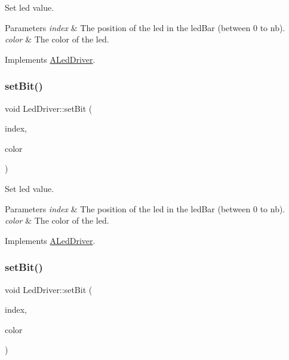 Set led value. 


\begin{DoxyParams}{Parameters}
{\em index} & The position of the led in the led\+Bar (between 0 to nb). \\
\hline
{\em color} & The color of the led. \\
\hline
\end{DoxyParams}


Implements \hyperlink{classALedDriver_acbc8507c36f0f4fa3afb845d81e56eb2}{A\+Led\+Driver}.

\mbox{\label{classLedDriver_a1856fb030d88bcacdc37dfce7f0f8136}} 
\subsubsection{\texorpdfstring{set\+Bit()}{setBit()}\hspace{0.1cm}{\footnotesize\ttfamily [4/5]}}
{\footnotesize\ttfamily void Led\+Driver\+::set\+Bit (\begin{DoxyParamCaption}\item[{int}]{index,  }\item[{Led\+Color}]{color }\end{DoxyParamCaption})\hspace{0.3cm}{\ttfamily [virtual]}}



Set led value. 


\begin{DoxyParams}{Parameters}
{\em index} & The position of the led in the led\+Bar (between 0 to nb). \\
\hline
{\em color} & The color of the led. \\
\hline
\end{DoxyParams}


Implements \hyperlink{classALedDriver_acbc8507c36f0f4fa3afb845d81e56eb2}{A\+Led\+Driver}.

\mbox{\label{classLedDriver_a1856fb030d88bcacdc37dfce7f0f8136}} 
\subsubsection{\texorpdfstring{set\+Bit()}{setBit()}\hspace{0.1cm}{\footnotesize\ttfamily [5/5]}}
{\footnotesize\ttfamily void Led\+Driver\+::set\+Bit (\begin{DoxyParamCaption}\item[{int}]{index,  }\item[{Led\+Color}]{color }\end{DoxyParamCaption})\hspace{0.3cm}{\ttfamily [virtual]}}



